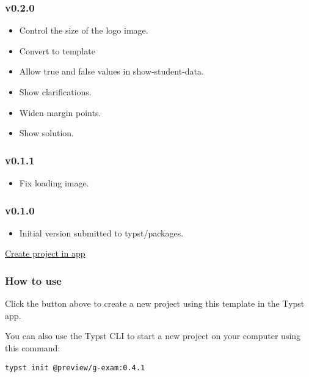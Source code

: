 \subsubsection{v0.2.0}\label{v0.2.0}

\begin{itemize}
\tightlist
\item
  Control the size of the logo image.
\item
  Convert to template
\item
  Allow true and false values in show-student-data.
\item
  Show clarifications.
\item
  Widen margin points.
\item
  Show solution.
\end{itemize}

\subsubsection{v0.1.1}\label{v0.1.1}

\begin{itemize}
\tightlist
\item
  Fix loading image.
\end{itemize}

\subsubsection{v0.1.0}\label{v0.1.0}

\begin{itemize}
\tightlist
\item
  Initial version submitted to typst/packages.
\end{itemize}

\href{/app?template=g-exam&version=0.4.1}{Create project in app}

\subsubsection{How to use}\label{how-to-use}

Click the button above to create a new project using this template in
the Typst app.

You can also use the Typst CLI to start a new project on your computer
using this command:

\begin{verbatim}
typst init @preview/g-exam:0.4.1
\end{verbatim}

